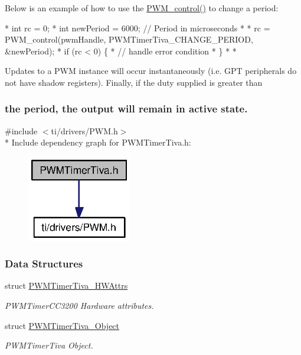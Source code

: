 Below is an example of how to use the \hyperlink{_p_w_m_8h_ade999f5b12997479efa1ac85aaf46ef5}{P\-W\-M\-\_\-control()} to change a period\-:


\begin{DoxyCode}
* \textcolor{keywordtype}{int} rc = 0;
* \textcolor{keywordtype}{int} newPeriod = 6000;   \textcolor{comment}{// Period in microseconds}
*
* rc = PWM_control(pwmHandle, PWMTimerTiva_CHANGE_PERIOD, &newPeriod);
* \textcolor{keywordflow}{if} (rc < 0) \{
*   \textcolor{comment}{// handle error condition}
* \}
*
* 
\end{DoxyCode}


Updates to a P\-W\-M instance will occur instantaneously (i.\-e. G\-P\-T peripherals do not have shadow registers). Finally, if the duty supplied is greater than \subsubsection*{the period, the output will remain in active state. }{\ttfamily \#include $<$ti/drivers/\-P\-W\-M.\-h$>$}\\*
Include dependency graph for P\-W\-M\-Timer\-Tiva.\-h\-:
\nopagebreak
\begin{figure}[H]
\begin{center}
\leavevmode
\includegraphics[width=129pt]{_p_w_m_timer_tiva_8h__incl}
\end{center}
\end{figure}
\subsubsection*{Data Structures}
\begin{DoxyCompactItemize}
\item 
struct \hyperlink{struct_p_w_m_timer_tiva___h_w_attrs}{P\-W\-M\-Timer\-Tiva\-\_\-\-H\-W\-Attrs}
\begin{DoxyCompactList}\small\item\em P\-W\-M\-Timer\-C\-C3200 Hardware attributes. \end{DoxyCompactList}\item 
struct \hyperlink{struct_p_w_m_timer_tiva___object}{P\-W\-M\-Timer\-Tiva\-\_\-\-Object}
\begin{DoxyCompactList}\small\item\em P\-W\-M\-Timer\-Tiva Object. \end{DoxyCompactList}\end{DoxyCompactItemize}

